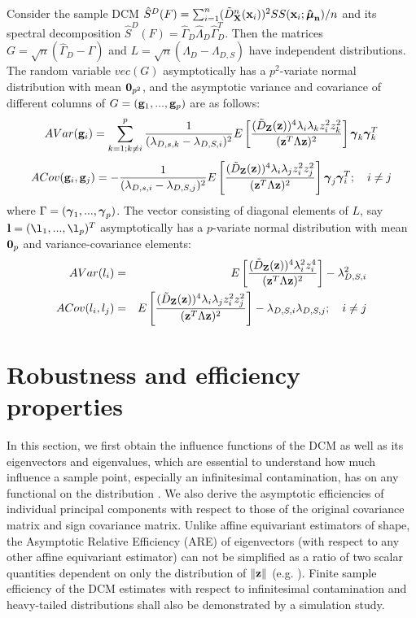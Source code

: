 \documentclass[fleqn,11pt]{article}
\begin{document}
\begin{Corollary} \label{Corollary:eigendist}
Consider the sample DCM $ \hat S^D(F) = \sum_{i=1}^n (\tilde D^n_{\mathbf{X}} ({\bf{x}}_i))^2 SS({\bf{x}}_i; {\bf \hat{{\boldsymbol{\mu}}}_n})/n $ and its spectral decomposition $\hat S^D(F) = \hat\Gamma_D \hat\Lambda_D \hat\Gamma_D^T $. Then the matrices $G = \sqrt n (\hat\Gamma_D - \Gamma) $ and $L = \sqrt n (\hat\Lambda_D - \Lambda_{D,S}) $ have independent distributions. The random variable $vec(G)$ asymptotically has a $p^2$-variate normal distribution with mean ${\bf 0}_{p^2}$, and the asymptotic variance and covariance of different columns of $G = ({\bf{g}}_1,...,{\bf{g}}_p)$ are as follows:
%
\begin{equation} \label{equation:DevEq}
AVar({\bf{g}}_i) = \sum_{k=1; k \neq i}^p \frac{1}{(\lambda_{D,s,k} - \lambda_{D,S,i})^2} E \left[ \frac{(\tilde D_{\mathbf{Z}} ({\bf{z}}))^4 \lambda_i \lambda_k z_i^2 z_k^2}{({\bf{z}}^T \Lambda {\bf{z}})^2} \right] {\boldsymbol{\gamma}}_k {\boldsymbol{\gamma}}_k^T
\end{equation}
%
\begin{equation}
ACov({\bf{g}}_i, {\bf{g}}_j) = - \frac{1}{(\lambda_{D,s,i} - \lambda_{D,S,j})^2} E \left[ \frac{(\tilde D_{\mathbf{Z}} ({\bf{z}}))^4 \lambda_i \lambda_j z_i^2 z_j^2}{({\bf{z}}^T \Lambda {\bf{z}})^2} \right] {\boldsymbol{\gamma}}_j {\boldsymbol{\gamma}}_i^T; \quad i \neq j
\end{equation}
%
where $\Gamma = ({\boldsymbol{\gamma}}_1,...,{\boldsymbol{\gamma}}_p)$. The vector consisting of diagonal elements of $L$, say $\bfl = (\l_1,...,\l_p)^T$ asymptotically has a $p$-variate normal distribution with mean ${\bf 0}_p$ and variance-covariance elements:
%
\begin{eqnarray}
AVar(l_i) &=& E \left[ \frac{(\tilde D_{\mathbf{Z}} ({\bf{z}}))^4 \lambda_i^2 z_i^4}{({\bf{z}}^T \Lambda {\bf{z}})^2} \right] - \lambda_{D,S,i}^2\\
ACov(l_i, l_j) &=& E \left[ \frac{(\tilde D_{\mathbf{Z}} ({\bf{z}}))^4 \lambda_i \lambda_j z_i^2 z_j^2}{({\bf{z}}^T \Lambda {\bf{z}})^2} \right] - \lambda_{D,S,i} \lambda_{D,S,j}; \quad i \neq j
\end{eqnarray}
%
\end{Corollary}

\section{Robustness and efficiency properties} \label{section:simSection}
In this section, we first obtain the influence functions of the DCM as well as its eigenvectors and eigenvalues, which are essential to understand how much influence a sample point, especially an infinitesimal contamination, has on any functional on the distribution \citep{hampel}. We also derive the asymptotic efficiencies of individual principal components with respect to those of the original covariance matrix and sign covariance matrix. Unlike affine equivariant estimators of shape, the Asymptotic Relative Efficiency (ARE) of eigenvectors (with respect to any other affine equivariant estimator) can not be simplified as a ratio of two scalar quantities dependent on only the distribution of $\| {\bf{z}} \|$ (e.g. \cite{taskinen12,ollilia03}). Finite sample efficiency of the DCM estimates with respect to infinitesimal contamination and heavy-tailed distributions shall also be demonstrated by a simulation study.
\end{document}
